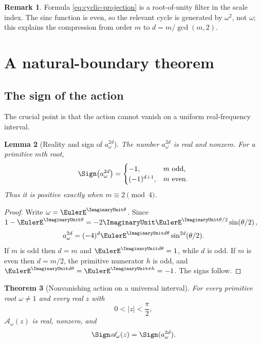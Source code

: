 \documentclass[11pt]{article}
\newtheorem{theorem}{Theorem}[section]
\newtheorem{lemma}[theorem]{Lemma}
\theoremstyle{definition}
\newtheorem{remark}[theorem]{Remark}
\newcommand{\Aact}{\mathscr A}
\begin{document}
\begin{remark}
Formula \cref{eq:cyclic-projection} is a root-of-unity filter in the scale index.  The sinc function is even, so the relevant cycle is generated by $\omega^2$, not $\omega$; this explains the compression from order $m$ to $d=m/\gcd(m,2)$.
\end{remark}

\section{A natural-boundary theorem}

\subsection{The sign of the action}

The crucial point is that the action cannot vanish on a uniform real-frequency interval.

\begin{lemma}[Reality and sign of $a_\omega^{2d}$]
The number $a_\omega^{2d}$ is real and nonzero.  For a primitive $m$th root,
\begin{equation}
 \Sign\bigl(a_\omega^{2d}\bigr)=
 \begin{cases}
 -1,&m\text{ odd},\\
 (-1)^{d+1},&m\text{ even}.
 \end{cases}
 \label{eq:sign-a}
\end{equation}
Thus it is positive exactly when $m\equiv2\pmod4$.
\end{lemma}

\begin{proof}
Write $\omega=\EulerE^{\ImaginaryUnit\theta}$.  Since
\(
 1-\EulerE^{\ImaginaryUnit\theta}=-2\ImaginaryUnit\EulerE^{\ImaginaryUnit\theta/2}\sin(\theta/2)
\),
\[
 a_\omega^{2d}=(-4)^d\EulerE^{\ImaginaryUnit d\theta}\sin^{2d}(\theta/2).
\]
If $m$ is odd then $d=m$ and $\EulerE^{\ImaginaryUnit d\theta}=1$, while $d$ is odd.  If $m$ is even then $d=m/2$, the primitive numerator $h$ is odd, and $\EulerE^{\ImaginaryUnit d\theta}=\EulerE^{\ImaginaryUnit\pi h}=-1$.  The signs follow.
\end{proof}

\begin{theorem}[Nonvanishing action on a universal interval]
For every primitive root $\omega\ne1$ and every real $z$ with
\begin{equation}
 0<|z|<\frac\pi2,
 \label{eq:zinterval}
\end{equation}
$\Aact_\omega(z)$ is real, nonzero, and
\begin{equation}
 \Sign\Aact_\omega(z)=\Sign(a_\omega^{2d}).
 \label{eq:sign-action}
\end{equation}
\end{theorem}
\end{document}
